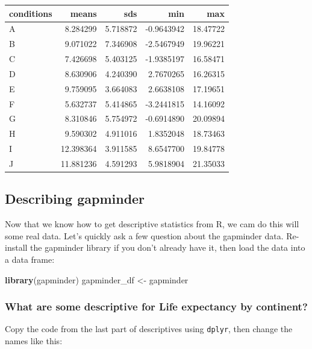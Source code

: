 \documentclass[]{book}
\newenvironment{Shaded}{\begin{snugshade}}{\end{snugshade}}
\newcommand{\KeywordTok}[1]{\textcolor[rgb]{0.13,0.29,0.53}{\textbf{{#1}}}}
\newcommand{\StringTok}[1]{\textcolor[rgb]{0.31,0.60,0.02}{{#1}}}
\newcommand{\NormalTok}[1]{{#1}}
\theoremstyle{definition}
\theoremstyle{definition}
\theoremstyle{definition}
\theoremstyle{remark}
\begin{document}
\begin{tabular}{l|r|r|r|r}
\hline
conditions & means & sds & min & max\\
\hline
A & 8.284299 & 5.718872 & -0.9643942 & 18.47722\\
\hline
B & 9.071022 & 7.346908 & -2.5467949 & 19.96221\\
\hline
C & 7.426698 & 5.403125 & -1.9385197 & 16.58471\\
\hline
D & 8.630906 & 4.240390 & 2.7670265 & 16.26315\\
\hline
E & 9.759095 & 3.664083 & 2.6638108 & 17.19651\\
\hline
F & 5.632737 & 5.414865 & -3.2441815 & 14.16092\\
\hline
G & 8.310846 & 5.754972 & -0.6914890 & 20.09894\\
\hline
H & 9.590302 & 4.911016 & 1.8352048 & 18.73463\\
\hline
I & 12.398364 & 3.911585 & 8.6547700 & 19.84778\\
\hline
J & 11.881236 & 4.591293 & 5.9818904 & 21.35033\\
\hline
\end{tabular}

\subsection{Describing gapminder}\label{describing-gapminder}

Now that we know how to get descriptive statistics from R, we cam do
this will some real data. Let's quickly ask a few question about the
gapminder data. Re-install the gapminder library if you don't already
have it, then load the data into a data frame:

\begin{Shaded}
\begin{Highlighting}[]
\KeywordTok{library}\NormalTok{(gapminder)}
\NormalTok{gapminder_df <-}\StringTok{ }\NormalTok{gapminder}
\end{Highlighting}
\end{Shaded}

\subsubsection{What are some descriptive for Life expectancy by
continent?}\label{what-are-some-descriptive-for-life-expectancy-by-continent}

Copy the code from the last part of descriptives using \texttt{dplyr},
then change the names like this:
\end{document}
